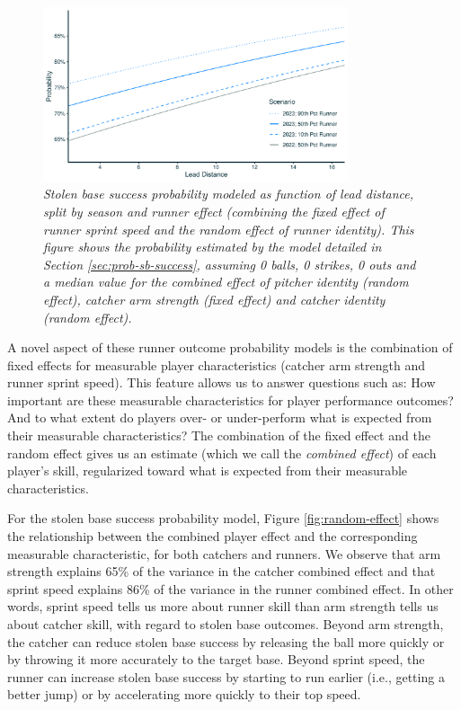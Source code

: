 \documentclass{article}
\begin{document}
      \begin{figure}
        \centering
        \includegraphics[width = 0.8\textwidth]{../../output/figures/prob_sb_success_light.pdf}
        \caption{
          \it Stolen base success probability modeled as function of lead distance, split by season and runner effect (combining the fixed effect of runner sprint speed and the random effect of runner identity). This figure shows the probability estimated by the model detailed in Section \ref{sec:prob-sb-success}, assuming 0 balls, 0 strikes, 0 outs and a median value for the combined effect of pitcher identity (random effect), catcher arm strength (fixed effect) and catcher identity (random effect).
        }
        \label{fig:prob-sb-success}
      \end{figure}

      A novel aspect of these runner outcome probability models is the combination of fixed effects for measurable player characteristics (catcher arm strength and runner sprint speed). This feature allows us to answer questions such as: How important are these measurable characteristics for player performance outcomes? And to what extent do players over- or under-perform what is expected from their measurable characteristics? The combination of the fixed effect and the random effect gives us an estimate (which we call the {\it combined effect}) of each player's skill, regularized toward what is expected from their measurable characteristics.

      For the stolen base success probability model, Figure \ref{fig:random-effect} shows the relationship between the combined player effect and the corresponding measurable characteristic, for both catchers and runners. We observe that arm strength explains 65\% of the variance in the catcher combined effect and that sprint speed explains 86\% of the variance in the runner combined effect. In other words, sprint speed tells us more about runner skill than arm strength tells us about catcher skill, with regard to stolen base outcomes. Beyond arm strength, the catcher can reduce stolen base success by releasing the ball more quickly or by throwing it more accurately to the target base. Beyond sprint speed, the runner can increase stolen base success by starting to run earlier (i.e., getting a better jump) or by accelerating more quickly to their top speed.
      
\end{document}
